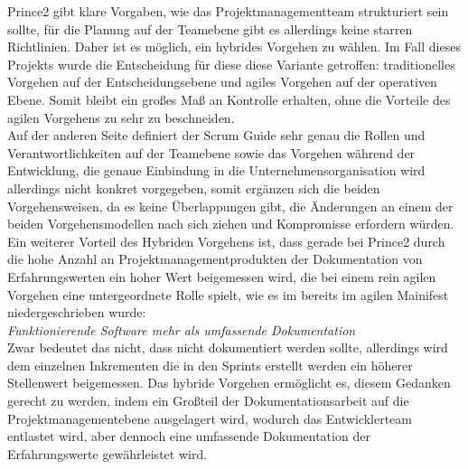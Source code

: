 Prince2 gibt klare Vorgaben, wie das Projektmanagementteam strukturiert sein sollte, für die Planung auf der Teamebene gibt es allerdings keine starren Richtlinien. Daher ist es möglich, ein hybrides Vorgehen zu wählen. Im Fall dieses Projekts wurde die Entscheidung für diese diese Variante getroffen: traditionelles Vorgehen auf der Entscheidungsebene und agiles Vorgehen auf der operativen Ebene. Somit bleibt ein großes Maß an Kontrolle erhalten, ohne die Vorteile des agilen Vorgehens zu sehr zu beschneiden.\\

Auf der anderen Seite definiert der Scrum Guide sehr genau die Rollen und Verantwortlichkeiten auf der Teamebene sowie das Vorgehen während der Entwicklung, die genaue Einbindung in die Unternehmensorganisation wird allerdings nicht konkret vorgegeben, somit ergänzen sich die beiden Vorgehensweisen, da es keine Überlappungen gibt, die Änderungen an einem der beiden Vorgehensmodellen nach sich ziehen und Kompromisse erfordern würden.\\

Ein weiterer Vorteil des Hybriden Vorgehens ist, dass gerade bei Prince2 durch die hohe Anzahl an Projektmanagementprodukten der Dokumentation von Erfahrungswerten ein hoher Wert beigemessen wird, die bei einem rein agilen Vorgehen eine untergeordnete Rolle spielt, wie es im bereits im agilen Mainifest niedergeschrieben wurde:\\

\textit{Funktionierende Software mehr als umfassende Dokumentation}\\

Zwar bedeutet das nicht, dass nicht dokumentiert werden sollte, allerdings wird dem einzelnen Inkrementen die in den Sprints erstellt werden ein höherer Stellenwert beigemessen. Das hybride Vorgehen ermöglicht es, diesem Gedanken gerecht zu werden, indem ein Großteil der Dokumentationsarbeit auf die Projektmanagementebene ausgelagert wird, wodurch das Entwicklerteam entlastet wird, aber dennoch eine umfassende Dokumentation der Erfahrungswerte gewährleistet wird.\\